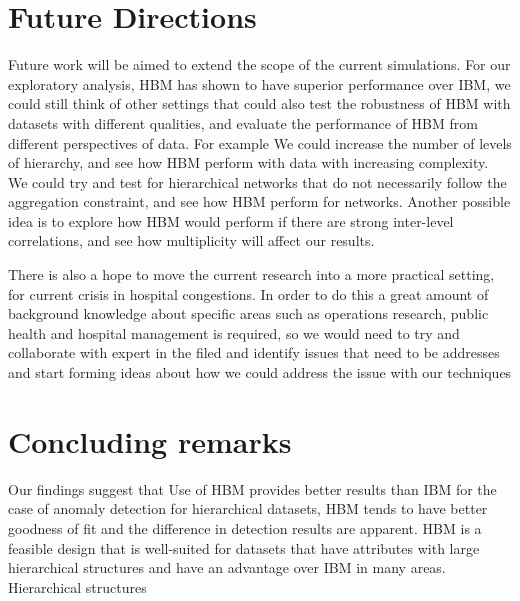 \section{Future Directions}

Future work will be aimed to extend the scope of the current simulations. For our exploratory analysis, HBM has shown to have superior performance over IBM, we could still think of other settings that could also test the robustness of HBM with datasets with different qualities, and evaluate the performance of HBM from different perspectives
of data. For example We could increase the number of levels of hierarchy, and see how HBM perform with data with increasing complexity. We could try and test for hierarchical networks that do not necessarily follow the aggregation constraint, and see how HBM perform for networks. Another possible idea is to explore how HBM would perform if there are strong inter-level correlations, and see how multiplicity will affect our results.

\newpara

There is also a hope to move the current research into a more practical setting, for current crisis in hospital congestions. In order to do this a great amount of background knowledge about specific areas such as operations research, public health and hospital management is required, so we would need to try and collaborate with expert in the filed and identify issues that need to be addresses and start forming ideas about how we could address the issue with our techniques
 
\section{Concluding remarks}


Our findings suggest that Use of HBM provides better results than IBM for the case of anomaly detection for hierarchical datasets, HBM tends to have better goodness of fit and the difference in detection results are apparent. HBM is a feasible design that is well-suited for datasets that have attributes with large hierarchical structures and have an advantage over IBM in many areas. Hierarchical structures 




